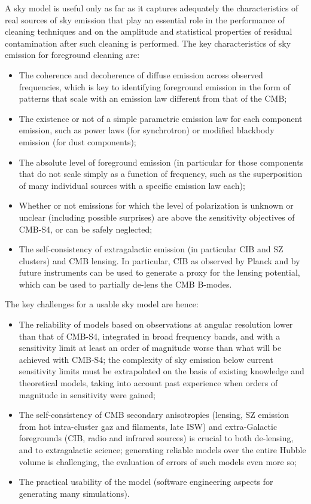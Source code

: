 A sky model is useful only as far as it captures adequately the characteristics of real sources of sky emission that play an essential role in the performance of cleaning techniques and on the amplitude and statistical properties of residual contamination after such cleaning is performed. The key characteristics of sky emission for foreground cleaning are:
\begin{itemize}
\item The coherence and decoherence of diffuse emission across observed frequencies, which is key to identifying foreground emission in the form of patterns that scale with an emission law different from that of the CMB;
\item The existence or not of a simple parametric emission law for each component emission, such as power laws (for synchrotron) or modified blackbody emission (for dust components);
\item The absolute level of foreground emission (in particular for those components that do not scale simply as a function of frequency, such as the superposition of many individual sources with a specific emission law each);
\item Whether or not emissions for which the level of polarization is unknown or unclear (including possible surprises) are above the sensitivity objectives of CMB-S4, or can be safely neglected;
\item The self-consistency of extragalactic emission (in particular CIB and SZ clusters) and CMB lensing. In particular, CIB as observed by Planck and by future instruments can be used to generate a proxy for the lensing potential, which can be used to partially de-lens the CMB B-modes.
\end{itemize} 


The key challenges for a usable sky model are hence:
\begin{itemize} 
\item The reliability of models based on observations at angular resolution lower than that of CMB-S4, integrated in broad frequency bands, and with a sensitivity limit at least an order of magnitude worse than what will be achieved with CMB-S4; the complexity of sky emission below current sensitivity limits must be extrapolated on the basis of existing knowledge and theoretical models, taking into account past experience when orders of magnitude in sensitivity were gained;
\item The self-consistency of CMB secondary anisotropies (lensing, SZ emission from hot intra-cluster gaz and filaments, late ISW) and extra-Galactic foregrounds (CIB, radio and infrared sources) is crucial to both de-lensing, and to extragalactic science; generating reliable models over the entire Hubble volume is challenging, the evaluation of errors of such models even more so;
\item The practical usability of the model (software engineering aspects for generating many simulations).
\end{itemize} 


